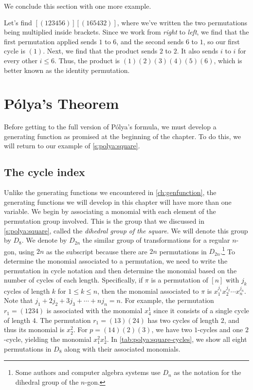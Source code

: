 We conclude this section with one more example.

\begin{example}
  Let's find $[(123456)][(165432)]$, where we've written the two
  permutations being multiplied inside brackets. Since we work from
  \emph{right} to \emph{left}, we find that the first permutation
  applied sends $1$ to $6$, and the second sends $6$ to $1$, so our
  first cycle is $(1)$. Next, we find that the product sends $2$ to
  $2$. It also sends $i$ to $i$ for every other $i\leq 6$. Thus, the
  product is $(1)(2)(3)(4)(5)(6)$, which is better known as the
  identity permutation.
\end{example}

\section{P\'olya's Theorem}\label{s:polya:polya}

Before getting to the full version of P\'olya's formula, we must
develop a generating function as promised at the beginning of the
chapter. To do this, we will return to our example of
\autoref{s:polya:square}.

\subsection{The cycle index}\label{ss:polya:polya:cycle-index}

Unlike the generating functions we encountered in
\autoref{ch:genfunction}, the generating functions we will develop in
this chapter will have more than one variable. We begin by associating
a monomial with each element of the permutation group involved. This
is the group that we discussed in \autoref{s:polya:square}, called the
\emph{dihedral group of the square}. We will denote this group by
$D_8$. We denote by $D_{2n}$ the similar group of transformations for
a regular $n$-gon, using $2n$ as the subscript because there are $2n$
permutations in $D_{2n}$.\footnote{Some authors and computer algebra
  systems use $D_n$ as the notation for the dihedral group of the
  $n$-gon.} To determine the monomial associated to a permutation, we
need to write the permutation in cycle notation and then determine the
monomial based on the number of cycles of each length. Specifically,
if $\pi$ is a permutation of $[n]$ with $j_k$ cycles of length $k$ for
$1\leq k\leq n$, then the monomial associated to $\pi$ is
$x_1^{j_1}x_2^{j_2}\cdots x_n^{j_n}$. Note that $j_1 + 2j_2 + 3j_3 +
\cdots + nj_n = n$. For example, the permutation $r_1=(1234)$ is
associated with the monomial $x_4^1$ since it consists of a single
cycle of length $4$. The permutation $r_1=(13)(24)$ has two cycles of
length $2$, and thus its monomial is $x_2^2$. For $p=(14)(2)(3)$, we
have two $1$-cycles and one $2$-cycle, yielding the monomial
$x_1^2x_2^1$. In \autoref{tab:polya:square-cycles}, we show all eight
permutations in $D_8$ along with their associated monomials.

